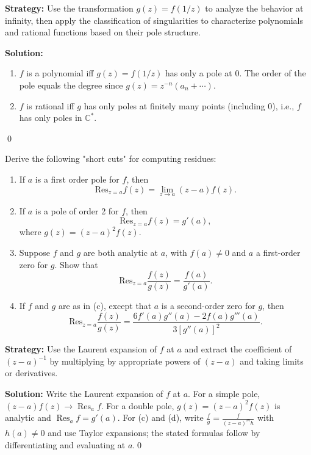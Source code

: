 \noindent\textbf{Strategy:} Use the transformation \( g(z) = f(1/z) \) to analyze the behavior at infinity, then apply the classification of singularities to characterize polynomials and rational functions based on their pole structure.

\bigskip\noindent\textbf{Solution:}
\begin{enumerate}[label=(\alph*)]
\item $f$ is a polynomial iff $g(z)=f(1/z)$ has only a pole at $0$. The order of the pole equals the degree since $g(z)=z^{-n}(a_n+\cdots)$.
\item $f$ is rational iff $g$ has only poles at finitely many points (including $0$), i.e., $f$ has only poles in $\mathbb C^*$.
\end{enumerate}\qed


\begin{problembox}
Derive the following "short cuts" for computing residues:
\begin{enumerate}[label=(\alph*)]
\item If \( a \) is a first order pole for \( f \), then
\[ \text{Res}_{z=a} f(z) = \lim_{z \to a} (z - a) f(z). \]
\item If \( a \) is a pole of order 2 for \( f \), then
\[ \text{Res}_{z=a} f(z) = g'(a), \]
where \( g(z) = (z - a)^2 f(z) \).
\item Suppose \( f \) and \( g \) are both analytic at \( a \), with \( f(a) \neq 0 \) and \( a \) a first-order zero for \( g \). Show that
\[ \text{Res}_{z=a} \frac{f(z)}{g(z)} = \frac{f(a)}{g'(a)}. \]
\item If \( f \) and \( g \) are as in (c), except that \( a \) is a second-order zero for \( g \), then
\[ \text{Res}_{z=a} \frac{f(z)}{g(z)} = \frac{6 f'(a) g''(a) - 2 f(a) g'''(a)}{3 [g''(a)]^2}. \]
\end{enumerate}
\end{problembox}

\noindent\textbf{Strategy:} Use the Laurent expansion of \( f \) at \( a \) and extract the coefficient of \( (z-a)^{-1} \) by multiplying by appropriate powers of \( (z-a) \) and taking limits or derivatives.

\bigskip\noindent\textbf{Solution:}
Write the Laurent expansion of $f$ at $a$. For a simple pole, $(z-a)f(z)\to\operatorname{Res}_a f$. For a double pole, $g(z)=(z-a)^2 f(z)$ is analytic and $\operatorname{Res}_a f=g'(a)$. For (c) and (d), write $\frac{f}{g}=\frac{f}{(z-a)^m h}$ with $h(a)\ne0$ and use Taylor expansions; the stated formulas follow by differentiating and evaluating at $a$.\qed


